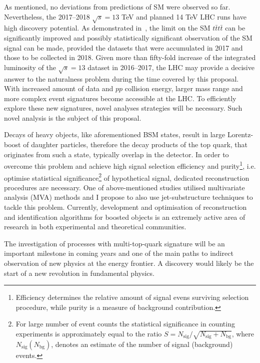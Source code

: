 \textcolor{\mycolor}{
As mentioned, no deviations from predictions of SM were observed so far. Nevertheless, the 2017--2018 $\sqrt{s}=13$ TeV and planned 14 TeV LHC runs have high discovery potential. As demonstrated in~\cite{Sirunyan:2017tep}, the limit on the SM $t\bar{t}t\bar{t}$ can be significantly improved and possibly statistically significant observation of the SM signal can be made, provided the datasets that were accumulated in 2017 and those to be collected in 2018. Given more than fifty-fold increase of the integrated luminosity of the $\sqrt{s}=13$ dataset in 2016--2017, the LHC may provide a decisive answer to the naturalness problem during the time covered by this proposal. With increased amount of data and $pp$ collision energy, larger mass range and more complex event signatures become accessible at the LHC. To efficiently explore these new signatures, novel analyses strategies will be necessary. Such novel analysis is the subject of this proposal.}

\textcolor{\mycolor}{
Decays of heavy objects, like  aforementioned BSM states, result in large Lorentz-boost of daughter particles, therefore the decay products of the top quark, that originates from such a state, typically overlap in the detector. In order to overcome this problem and achieve high signal selection efficiency and purity\footnote{Efficiency determines the relative amount of signal evens surviving selection procedure, while purity is a measure of background contribution.}, i.e. optimise statistical significance\footnote{For large number of event counts the statistical significance in counting experiments is approximately equal to the ratio $S=N_{\mathrm{sig}}/\sqrt{N_{\mathrm{sig}}+N_{\mathrm{bg}}}$, where $N_{\mathrm{sig}}\left(N_{\mathrm{bg}}\right)$, denotes an estimate of the number of signal (background) events.} of hypothetical signal, dedicated reconstruction procedures are necessary. One of above-mentioned studies utilised multivariate analysis (MVA) methods and I propose to also use jet-substructure techniques to tackle this problem. Currently, development and optimisation of reconstruction and identification algorithms for boosted objects is an extremely active area of research in both experimental and theoretical communities.}

\textcolor{\mycolor}{
The investigation of processes with multi-top-quark signature will be an important milestone in coming years and one of the main paths to indirect observation of new physics at the energy frontier. A discovery would likely be the start of a new revolution in fundamental physics. }
